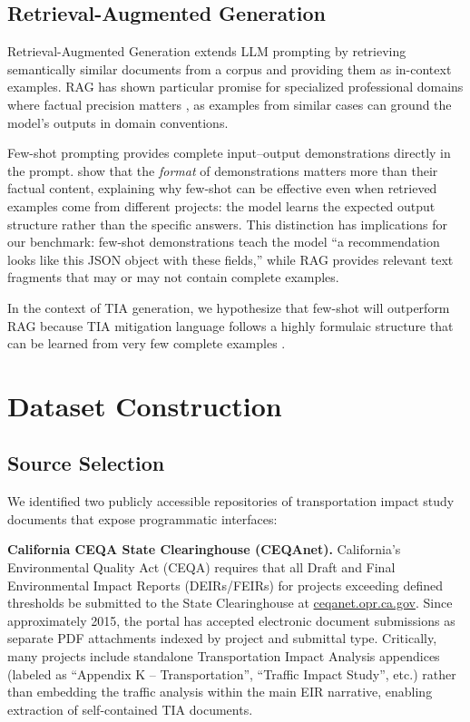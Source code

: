 \documentclass[preprint,12pt]{elsarticle}
\begin{document}
\subsection{Retrieval-Augmented Generation}

Retrieval-Augmented Generation \citep{RAG2020, gao2023rag} extends LLM prompting
by retrieving semantically similar documents from a corpus and providing them
as in-context examples.
RAG has shown particular promise for specialized professional domains where
factual precision matters \citep{RAG2020, gao2023rag}, as examples from
similar cases can ground the model's outputs in domain conventions.

Few-shot prompting \citep{brown2020gpt3} provides complete input--output
demonstrations directly in the prompt.
\citet{min2022rethinking} show that the \emph{format} of demonstrations
matters more than their factual content, explaining why few-shot can be
effective even when retrieved examples come from different projects:
the model learns the expected output structure rather than the specific answers.
This distinction has implications for our benchmark: few-shot demonstrations
teach the model ``a recommendation looks like this JSON object with these
fields,'' while RAG provides relevant text fragments that may or may not
contain complete examples.

In the context of TIA generation, we hypothesize that few-shot will outperform
RAG because TIA mitigation language follows a highly formulaic structure that
can be learned from very few complete examples \citep{zhao2021calibrate}.

\section{Dataset Construction}
\label{sec:data}

\subsection{Source Selection}

We identified two publicly accessible repositories of transportation impact
study documents that expose programmatic interfaces:

\textbf{California CEQA State Clearinghouse (CEQAnet).}
California's Environmental Quality Act (CEQA) requires that all Draft and
Final Environmental Impact Reports (DEIRs/FEIRs) for projects exceeding
defined thresholds be submitted to the State Clearinghouse at
\url{ceqanet.opr.ca.gov}.
Since approximately 2015, the portal has accepted electronic document
submissions as separate PDF attachments indexed by project and submittal type.
Critically, many projects include standalone Transportation Impact Analysis
appendices (labeled as ``Appendix K -- Transportation'', ``Traffic Impact
Study'', etc.) rather than embedding the traffic analysis within the main EIR
narrative, enabling extraction of self-contained TIA documents.
\end{document}

